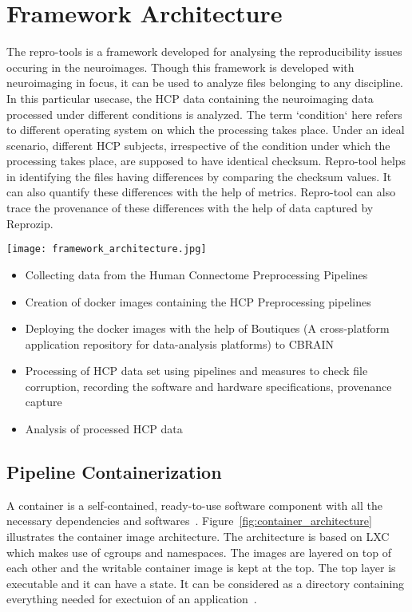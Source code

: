 \chapter{Framework Architecture}
The repro-tools  is a framework developed for analysing the reproducibility issues occuring in the neuroimages. Though this framework is developed with neuroimaging in focus, it can be used to analyze files belonging to any discipline. In this particular usecase, the HCP data containing the neuroimaging data processed under different conditions is analyzed. The term `condition` here refers to different operating system on which the processing takes place. Under an ideal scenario, different HCP subjects, irrespective of the condition under which the processing takes place, are supposed to have identical checksum. Repro-tool helps in identifying the files having differences by comparing the checksum values. It can also quantify these differences with the help of metrics. Repro-tool can also trace the provenance of these differences with the help of data captured by Reprozip.

\begin{center}
\texttt{[image: framework\_architecture.jpg]}
\label{fig:framework_architecture}
\end{center}

  \begin{itemize}
  \item Collecting data from the Human Connectome Preprocessing Pipelines~\cite{DBHumanConnectome}
  \item Creation of docker images containing the HCP Preprocessing pipelines
  \item Deploying the docker images with the help of Boutiques (A cross-platform application repository for data-analysis platforms) to CBRAIN
  \item Processing of HCP data set using pipelines and measures to check file corruption, recording the software and hardware specifications, provenance capture
  \item Analysis of processed HCP data
  \end{itemize}

\section{Pipeline Containerization}
A container is a self-contained, ready-to-use software component with all the necessary dependencies and softwares~\cite{7158965}. Figure~\ref{fig:container_architecture} illustrates the container image architecture. The architecture is based on LXC which makes use of  cgroups and namespaces. The images are layered on top of each other and the writable container image is kept at the top. The top layer is executable and it can have a state. It can be considered as a directory containing everything needed for exectuion of an application~\cite{7158965}.\\

